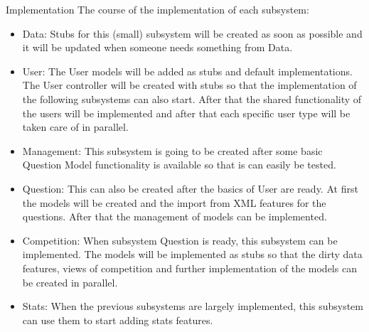 \documentclass[10pt,a4paper]{article}
\begin{document}
\begin{section}{Implementation}
	The course of the implementation of each subsystem:
	\begin{itemize}
		\item Data:
			Stubs for this (small) subsystem will be created as soon as possible and it
			will be updated when someone needs something from Data.
		\item User:
			The User models will be added as stubs and default implementations. The
			User controller will be created with stubs so that the implementation of the
			following subsystems can also start. After that the shared functionality of
			the users will be implemented and after that each specific user type will
			be taken care of in parallel.
  		\item Management:
  			This subsystem is going to be created after some basic Question Model
  			functionality is available so that is can easily be tested.	
  		\item Question:
  			This can also be created after the basics of User are ready. At first the models
  			will be created and the import from XML features for the questions. After that
  			the management of models can be implemented.
  		\item Competition:
  			When subsystem Question is ready, this subsystem can be implemented. The
  			models will be implemented as stubs so that the dirty data features, views
  			of competition and further implementation of the models can be created in
  			parallel.
  		\item Stats:
  			When the previous subsystems are largely implemented, this subsystem can use
  			them to start adding stats features.
  		
	\end{itemize}
\end{section}

\end{document}

